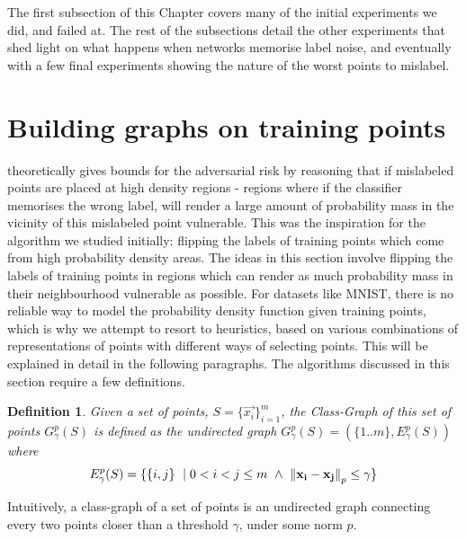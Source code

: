 \documentclass{ociamthesis}
\newtheorem{definition}{Definition}
\begin{document}
The first subsection of this Chapter covers many of the initial experiments we
did, and failed at. The rest of the subsections detail the other experiments
that shed light on what happens when networks memorise label noise, and
eventually with a few final experiments showing the nature of the worst points
to mislabel.



\section{Building graphs on training points}

\citet{sanyal2021how} theoretically gives bounds for the adversarial risk by
reasoning that if mislabeled points are placed at high density regions - regions
where if the classifier memorises the wrong label, will render a large amount of
probability mass in the vicinity of this mislabeled point vulnerable. This was
the inspiration for the algorithm we studied initially: flipping the labels of
training points which come from high probability density areas. The ideas in
this section involve flipping the labels of training points in regions which can
render as much probability mass in their neighbourhood vulnerable as possible.
For datasets like MNIST, there is no reliable way to model the probability
density function given training points, which is why we attempt to resort to
heuristics, based on various combinations of representations of points with
different ways of selecting points. This will be explained in detail in the
following paragraphs. The algorithms discussed in this section require a few
definitions.

\begin{definition}
    Given a set of points, $S=\{\vec{x_i}\}_{i=1}^m$, the Class-Graph of this
    set of points $G_\gamma^{p}(S)$ is defined as the undirected graph
    $G_\gamma^{p}(S) = (\{1..m\}, E_\gamma^p(S))$ where
    \begin{equation*}
        E_\gamma^p(S) =
        \{\{i, j\}~\mid 0 < i < j \leq m~\wedge~
        \mathrm{\left\lVert{\mathbf{x_i}}-{\mathbf{x_j}}\right\rVert}_p \leq \gamma \}
    \end{equation*}
    \label{def:class-graph}
\end{definition}
Intuitively, a class-graph of a set of points is an undirected graph connecting
every two points closer than a threshold $\gamma$, under some norm $p$.
\end{document}
